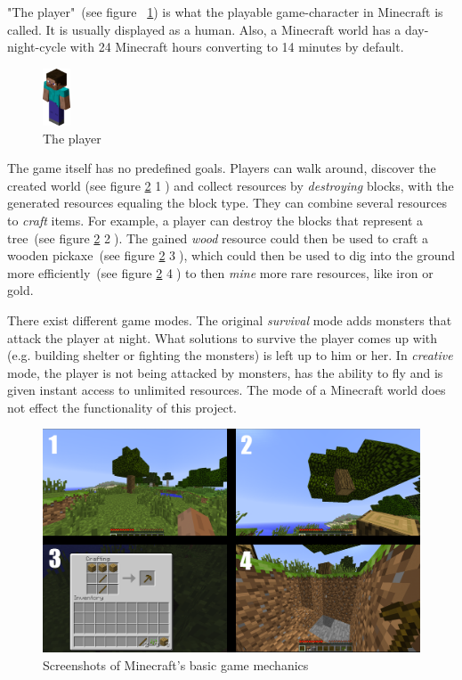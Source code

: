"The player"~(see figure ~\ref{mc_player}) is what the playable game-character in Minecraft is called. It is usually displayed as a human.
Also, a Minecraft world has a day-night-cycle with 24 Minecraft hours converting to 14 minutes by default.

\begin{figure}
  \begin{center}
    \includegraphics[width=0.072\textwidth]{graphics/player}
  \end{center}
  \caption[The player]{The player \cite{image_mob}}
  \label{mc_player}
\end{figure} 

The game itself has no predefined goals. Players can walk around, discover the created world (see figure \ref{mc_mechanics} \textcircled{1}) and collect resources by \emph{destroying} blocks, with the generated resources equaling the block type. They can combine several resources to \emph{craft} items. For example, a player can destroy the blocks that represent a tree~(see figure \ref{mc_mechanics} \textcircled{2}). The gained \emph{wood} resource could then be used to craft a wooden pickaxe~(see figure \ref{mc_mechanics} \textcircled{3}), which could then be used to dig into the ground more efficiently~(see figure \ref{mc_mechanics} \textcircled{4}) to then \emph{mine} more rare resources, like iron or gold.

There exist different game modes. The original \emph{survival} mode adds monsters that attack the player at night. What solutions to survive the player comes up with (e.g. building shelter or fighting the monsters) is left up to him or her.
In \emph{creative} mode, the player is not being attacked by monsters, has the ability to fly and is given instant access to unlimited resources. The mode of a Minecraft world does not effect the functionality of this project.

\begin{figure}[h]
  \centering
    \includegraphics[width=15cm]{graphics/minecraft_mechanics}
  \caption{Screenshots of Minecraft's basic game mechanics}
  \label{mc_mechanics}
\end{figure}

